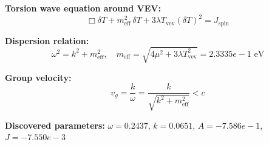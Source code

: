 
\textbf{Torsion wave equation around VEV:}
\begin{equation}
  \Box \delta T + m_{\text{eff}}^2 \, \delta T + 3\lambda T_{\text{vev}} (\delta T)^2 = J_{\text{spin}}
\end{equation}

\textbf{Dispersion relation:}
\begin{equation}
  \omega^2 = k^2 + m_{\text{eff}}^2, \quad
  m_{\text{eff}} = \sqrt{4\mu^2 + 3\lambda T_{\text{vev}}^2} = 2.3335e-1 \text{ eV}
\end{equation}

\textbf{Group velocity:}
\begin{equation}
  v_g = \frac{k}{\omega} = \frac{k}{\sqrt{k^2 + m_{\text{eff}}^2}} < c
\end{equation}

\textbf{Discovered parameters:}
$\omega = 0.2437$, \quad
$k = 0.0651$, \quad
$A = -7.586e-1$, \quad
$J = -7.550e-3$